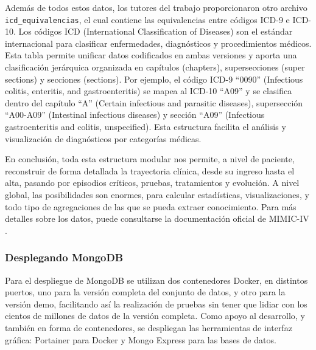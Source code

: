 Además de todos estos datos, los tutores del trabajo proporcionaron otro archivo \texttt{icd\_equivalencias}, el cual contiene las equivalencias entre códigos ICD-9 e ICD-10. Los códigos ICD (International Classification of Diseases) son el estándar internacional para clasificar enfermedades, diagnósticos y procedimientos médicos. Esta tabla permite unificar datos codificados en ambas versiones y aporta una clasificación jerárquica organizada en capítulos (chapters), supersecciones (super sections) y secciones (sections). Por ejemplo, el código ICD-9 ``0090'' (Infectious colitis, enteritis, and gastroenteritis) se mapea al ICD-10 ``A09'' y se clasifica dentro del capítulo ``A'' (Certain infectious and parasitic diseases), supersección ``A00-A09'' (Intestinal infectious diseases) y sección ``A09'' (Infectious gastroenteritis and colitis, unspecified). Esta estructura facilita el análisis y visualización de diagnósticos por categorías médicas.

En conclusión, toda esta estructura modular nos permite, a nivel de paciente, reconstruir de forma detallada la trayectoria clínica, desde su ingreso hasta el alta, pasando por episodios críticos, pruebas, tratamientos y evolución. A nivel global, las posibilidades son enormes, para calcular estadísticas, visualizaciones, y todo tipo de agregaciones de las que se pueda extraer conocimiento. Para más detalles sobre los datos, puede consultarse la documentación oficial de MIMIC-IV \cite{MIMICIV_docs}.

\subsubsection{Desplegando MongoDB}

Para el despliegue de MongoDB se utilizan dos contenedores Docker, en distintos puertos, uno para la versión completa del conjunto de datos, y otro para la versión demo, facilitando así la realización de pruebas sin tener que lidiar con los cientos de millones de datos de la versión completa. Como apoyo al desarrollo, y también en forma de contenedores, se despliegan las herramientas de interfaz gráfica: Portainer para Docker\cite{portainer_ce} y Mongo Express para las bases de datos\cite{mongo_express}. 



